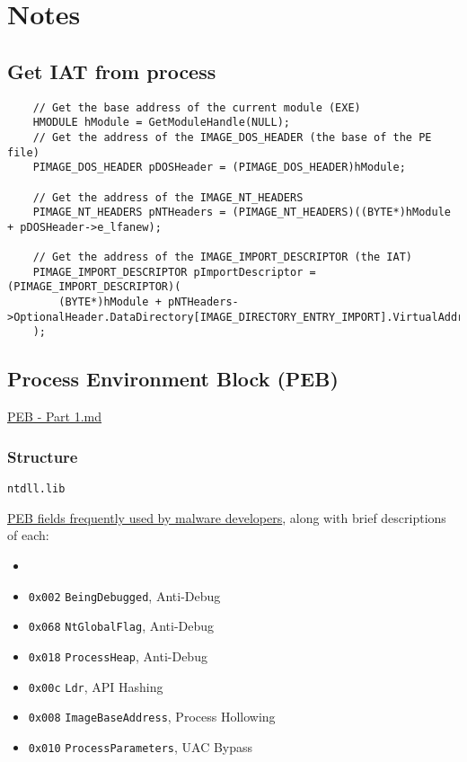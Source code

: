 \section{Notes}

\subsection{Get IAT from process}
\begin{verbatim}
    // Get the base address of the current module (EXE)
    HMODULE hModule = GetModuleHandle(NULL);
    // Get the address of the IMAGE_DOS_HEADER (the base of the PE file)
    PIMAGE_DOS_HEADER pDOSHeader = (PIMAGE_DOS_HEADER)hModule;

    // Get the address of the IMAGE_NT_HEADERS
    PIMAGE_NT_HEADERS pNTHeaders = (PIMAGE_NT_HEADERS)((BYTE*)hModule + pDOSHeader->e_lfanew);

    // Get the address of the IMAGE_IMPORT_DESCRIPTOR (the IAT)
    PIMAGE_IMPORT_DESCRIPTOR pImportDescriptor = (PIMAGE_IMPORT_DESCRIPTOR)(
        (BYTE*)hModule + pNTHeaders->OptionalHeader.DataDirectory[IMAGE_DIRECTORY_ENTRY_IMPORT].VirtualAddress
    );
\end{verbatim}


\subsection{Process Environment Block (PEB)}

\href{https://github.com/Faran-17/Windows-Internals/blob/main/Processes%20and%20Jobs/Processes/PEB%20-%20Part%201.md}{PEB - Part 1.md}

\subsubsection{Structure}
\verb+ntdll.lib+

\href{https://metehan-bulut.medium.com/understanding-the-process-environment-block-peb-for-malware-analysis-26315453793f}{PEB fields frequently used by malware developers}, along with brief descriptions of each:
\begin{itemize}
    \item 
    \item \verb+0x002+ \verb+BeingDebugged+, Anti-Debug
    \item \verb+0x068+ \verb+NtGlobalFlag+, Anti-Debug
    \item \verb+0x018+ \verb+ProcessHeap+, Anti-Debug
    \item \verb+0x00c+ \verb+Ldr+, API Hashing
    \item \verb+0x008+ \verb+ImageBaseAddress+, Process Hollowing
    \item \verb+0x010+ \verb+ProcessParameters+, UAC Bypass
\end{itemize}


